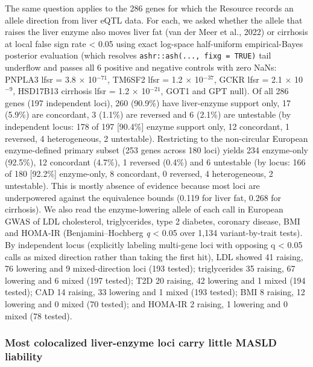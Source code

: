 The same question applies to the 286 genes for which the Resource records an allele direction from liver eQTL data. For each, we asked whether the allele that raises the liver enzyme also moves liver fat (van der Meer et al., 2022) or cirrhosis at local false sign rate \textless{} 0.05 using exact log-space half-uniform empirical-Bayes posterior evaluation (which resolves \texttt{ashr::ash(..., fixg = TRUE)} tail underflow and passes all 6 positive and negative controls with zero NaNs: PNPLA3 lfsr = 3.8 $\times$ 10$^{-71}$, TM6SF2 lfsr = 1.2 $\times$ 10$^{-37}$, GCKR lfsr = 2.1 $\times$ 10$^{-9}$, HSD17B13 cirrhosis lfsr = 1.2 $\times$ 10$^{-21}$, GOT1 and GPT null). Of all 286 genes (197 independent loci), 260 (90.9\%) have liver-enzyme support only, 17 (5.9\%) are concordant, 3 (1.1\%) are reversed and 6 (2.1\%) are untestable (by independent locus: 178 of 197 [90.4\%] enzyme support only, 12 concordant, 1 reversed, 4 heterogeneous, 2 untestable). Restricting to the non-circular European enzyme-defined primary subset (253 genes across 180 loci) yields 234 enzyme-only (92.5\%), 12 concordant (4.7\%), 1 reversed (0.4\%) and 6 untestable (by locus: 166 of 180 [92.2\%] enzyme-only, 8 concordant, 0 reversed, 4 heterogeneous, 2 untestable). This is mostly absence of evidence because most loci are underpowered against the equivalence bounds (0.119 for liver fat, 0.268 for cirrhosis). We also read the enzyme-lowering allele of each call in European GWAS of LDL cholesterol, triglycerides, type 2 diabetes, coronary disease, BMI and HOMA-IR (Benjamini--Hochberg \emph{q} \textless{} 0.05 over 1,134 variant-by-trait tests). By independent locus (explicitly labeling multi-gene loci with opposing q \textless{} 0.05 calls as mixed direction rather than taking the first hit), LDL showed 41 raising, 76 lowering and 9 mixed-direction loci (193 tested); triglycerides 35 raising, 67 lowering and 6 mixed (197 tested); T2D 20 raising, 42 lowering and 1 mixed (194 tested); CAD 14 raising, 33 lowering and 1 mixed (193 tested); BMI 8 raising, 12 lowering and 0 mixed (70 tested); and HOMA-IR 2 raising, 1 lowering and 0 mixed (78 tested).

\subsubsection{Most colocalized liver-enzyme loci carry little MASLD liability}\label{enzyme-loci-disease-liability}

